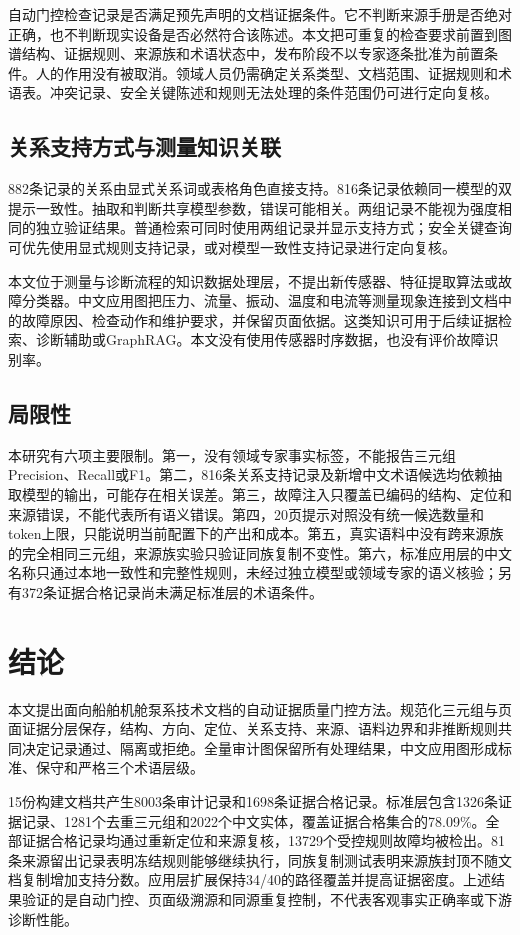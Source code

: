 \documentclass[conference,a4paper]{IEEEtran}
\begin{document}
自动门控检查记录是否满足预先声明的文档证据条件。它不判断来源手册是否绝对正确，也不判断现实设备是否必然符合该陈述。本文把可重复的检查要求前置到图谱结构、证据规则、来源族和术语状态中，发布阶段不以专家逐条批准为前置条件。人的作用没有被取消。领域人员仍需确定关系类型、文档范围、证据规则和术语表。冲突记录、安全关键陈述和规则无法处理的条件范围仍可进行定向复核。

\subsection{关系支持方式与测量知识关联}

882条记录的关系由显式关系词或表格角色直接支持。816条记录依赖同一模型的双提示一致性。抽取和判断共享模型参数，错误可能相关。两组记录不能视为强度相同的独立验证结果。普通检索可同时使用两组记录并显示支持方式；安全关键查询可优先使用显式规则支持记录，或对模型一致性支持记录进行定向复核。

本文位于测量与诊断流程的知识数据处理层，不提出新传感器、特征提取算法或故障分类器。中文应用图把压力、流量、振动、温度和电流等测量现象连接到文档中的故障原因、检查动作和维护要求，并保留页面依据。这类知识可用于后续证据检索、诊断辅助或GraphRAG。本文没有使用传感器时序数据，也没有评价故障识别率。

\subsection{局限性}

本研究有六项主要限制。第一，没有领域专家事实标签，不能报告三元组Precision、Recall或F1。第二，816条关系支持记录及新增中文术语候选均依赖抽取模型的输出，可能存在相关误差。第三，故障注入只覆盖已编码的结构、定位和来源错误，不能代表所有语义错误。第四，20页提示对照没有统一候选数量和token上限，只能说明当前配置下的产出和成本。第五，真实语料中没有跨来源族的完全相同三元组，来源族实验只验证同族复制不变性。第六，标准应用层的中文名称只通过本地一致性和完整性规则，未经过独立模型或领域专家的语义核验；另有372条证据合格记录尚未满足标准层的术语条件。

\section{结论}

本文提出面向船舶机舱泵系技术文档的自动证据质量门控方法。规范化三元组与页面证据分层保存，结构、方向、定位、关系支持、来源、语料边界和非推断规则共同决定记录通过、隔离或拒绝。全量审计图保留所有处理结果，中文应用图形成标准、保守和严格三个术语层级。

15份构建文档共产生8003条审计记录和1698条证据合格记录。标准层包含1326条证据记录、1281个去重三元组和2022个中文实体，覆盖证据合格集合的78.09\%。全部证据合格记录均通过重新定位和来源复核，13729个受控规则故障均被检出。81条来源留出记录表明冻结规则能够继续执行，同族复制测试表明来源族封顶不随文档复制增加支持分数。应用层扩展保持34/40的路径覆盖并提高证据密度。上述结果验证的是自动门控、页面级溯源和同源重复控制，不代表客观事实正确率或下游诊断性能。
\end{document}
